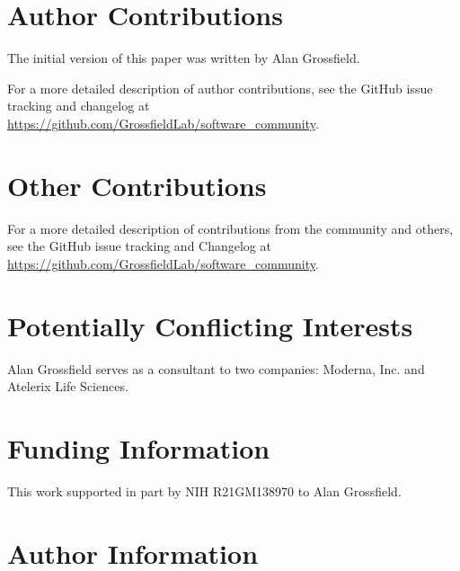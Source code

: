 \documentclass[9pt,training]{livecoms}
\newcommand{\githubrepository}{\url{https://github.com/GrossfieldLab/software_community}}
\begin{document}
\section{Author Contributions}
%
The initial version of this paper was written by Alan Grossfield.


For a more detailed description of author contributions,
see the GitHub issue tracking and changelog at \githubrepository.

\section{Other Contributions}
%


For a more detailed description of contributions from the community and others, see the GitHub issue tracking and Changelog at \githubrepository.

\section{Potentially Conflicting Interests}

Alan Grossfield serves as a consultant to two companies: Moderna, Inc.
and Atelerix Life Sciences.

\section{Funding Information}
This work supported in part by NIH R21GM138970 to Alan Grossfield.

\section*{Author Information}
\makeorcid




\end{document}

